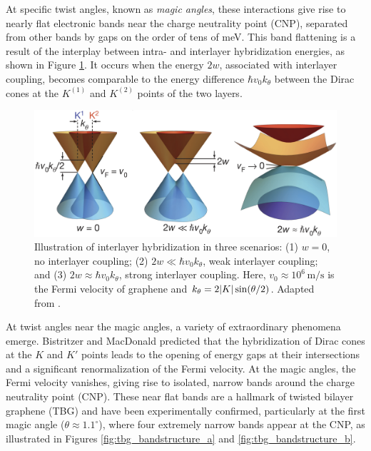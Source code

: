 At specific twist angles, known as \textit{magic angles}, these interactions give rise to nearly flat electronic bands near the charge neutrality point (CNP), separated from other bands by gaps on the order of tens of meV. This band flattening is a result of the interplay between intra- and interlayer hybridization energies, as shown in Figure \ref{fig:tbg_dirac_cones}. It occurs when the energy \(2w\), associated with interlayer coupling, becomes comparable to the energy difference \(\hbar v_0 k_\theta\) between the Dirac cones at the \(K^{(1)}\) and \(K^{(2)}\) points of the two layers.

\begin{figure}[H]
\centering
\includegraphics[width=0.70\linewidth]{fig/tbg_dirac_cones}
\caption{Illustration of interlayer hybridization in three scenarios: (1) \( w = 0 \), no interlayer coupling; (2) \( 2w \ll \hbar v_0 k_\theta \), weak interlayer coupling; and (3) \( 2w \approx \hbar v_0 k_\theta \), strong interlayer coupling. Here, \( v_0 \approx 10^6 \, \text{m/s} \) is the Fermi velocity of graphene and $k_\theta = 2 \abs{K} \sin(\theta/2)$. Adapted from \cite{cao2018_correlated}.}
\label{fig:tbg_dirac_cones}
\end{figure}

At twist angles near the magic angles, a variety of extraordinary phenomena emerge. Bistritzer and MacDonald \cite{macdonald2011} predicted that the hybridization of Dirac cones at the \(K\) and \(K'\) points leads to the opening of energy gaps at their intersections and a significant renormalization of the Fermi velocity. At the magic angles, the Fermi velocity vanishes, giving rise to isolated, narrow bands around the charge neutrality point (CNP). These near flat bands are a hallmark of twisted bilayer graphene (TBG) and have been experimentally confirmed, particularly at the first magic angle (\(\theta \approx 1.1^\circ\)), where four extremely narrow bands appear at the CNP, as illustrated in Figures \ref{fig:tbg_bandstructure_a} and \ref{fig:tbg_bandstructure_b}.

